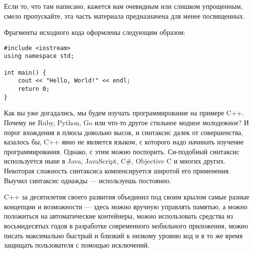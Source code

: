 \documentclass{article}
\begin{document}

Если то, что там написано, кажется вам очевидным или слишком упрощенным, смело пропускайте, эта часть материала предназначена для менее посвященных.

Фрагменты исходного кода оформлены следующим образом:

\begin{lstlisting}[caption={Пример оформления кода}, captionpos=b, style=cpp]
#include <iostream>
using namespace std;

int main() {
	cout << "Hello, World!" << endl;
	return 0;
}
\end{lstlisting}

Как вы уже догадались, мы будем изучать программирование на примере C++. Почему не Ruby, Python, Go или что-то другое стильное модное молодежное? И порог вхождения в плюсы довольно высок, и синтаксис далек от совершенства, казалось бы, C++ явно не является языком, с которого надо начинать изучение программирования. Однако, с этим можно поспорить. Си-подобный синтаксис используется ныне в Java, JavaScript, C\#, Objective C и многих других. Некоторая сложность синтаксиса компенсируется широтой его применения. Выучил синтаксис однажды --- используешь постоянно.

C++ за десятилетия своего развития объединил под своим крылом самые разные концепции и возможности --- здесь можно вручную управлять памятью, а можно положиться на автоматические контейнеры, можно использовать средства из восьмидесятых годов в разработке современного мобильного приложения, можно писать максимально быстрый и близкий к низкому уровню код и в то же время защищать пользователя с помощью исключений.
\end{document}
